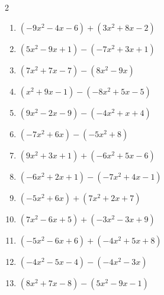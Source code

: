 \begin{multicols}{2}
\begin{enumerate}

\columnbreak %

  \item $(-9x^{2}-4x-6)+(3x^{2}+8x-2)$


  \item $(5x^{2}-9x+1)-(-7x^{2}+3x+1)$


  \item $(7x^{2}+7x-7)-(8x^{2}-9x)$


  \item $(x^{2}+9x-1)-(-8x^{2}+5x-5)$


  \item $(9x^{2}-2x-9)-(-4x^{2}+x+4)$


  \item $(-7x^{2}+6x)-(-5x^{2}+8)$


  \item $(9x^{2}+3x+1)+(-6x^{2}+5x-6)$


  \item $(-6x^{2}+2x+1)-(-7x^{2}+4x-1)$


  \item $(-5x^{2}+6x)+(7x^{2}+2x+7)$


  \item $(7x^{2}-6x+5)+(-3x^{2}-3x+9)$


  \item $(-5x^{2}-6x+6)+(-4x^{2}+5x+8)$


  \item $(-4x^{2}-5x-4)-(-4x^{2}-3x)$

        \phantom{$=-2x-4$}

  \item $(8x^{2}+7x-8)-(5x^{2}-9x-1)$



\end{enumerate}
\end{multicols}
